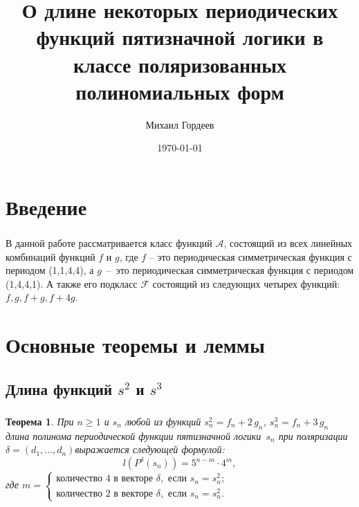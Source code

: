 \documentclass[t]{beamer}
\title{О длине некоторых периодических функций пятизначной логики в классе поляризованных
    полиномиальных форм}
\author{Михаил Гордеев}
\date{\today}
\institute[МГУ]{МОСКОВСКИЙ ГОСУДАРСТВЕННЫЙ УНИВЕРСИТЕТ \\
    Факультет Вычислительной Математики и Кибернетики}
\newtheorem{myth}{Теорема}
\newtheorem*{mydef}{Определение}
\begin{document}
\frame[plain]{\titlepage}

\section{Введение}
\begin{frame}
\frametitle{\insertsection}
В данной работе рассматривается класс функций $\mathcal{A}$, состоящий из всех линейных комбинаций
функций $f$ и $g$, где $f$ -- это периодическая симметрическая функция с периодом (1,1,4,4), а
\mbox{$g$ -- это} периодическая симметрическая функция с периодом (1,4,4,1). А также его подкласс
$\mathcal{F}$ состоящий из следующих четырех функций: $f,g,f+g,f+4g$.
\end{frame}

\section{Основные теоремы и леммы}
\subsection{Длина функций $s^2$ и $s^3$}
\begin{frame}
\frametitle{\insertsection}
\framesubtitle{\insertsubsection}
\begin{myth}
\label{ths}
При $n \geqslant 1$ и $s_n$ любой из функций ${s^2_n = f_n + 2\,g_n}$, ${s^3_n = f_n + 3\,g_n}$
длина полинома периодической функции пятизначной логики~$s_n$
при поляризации $\delta = (d_1,\ldots,d_n)$выражается следующей формулой:
$$ l(P^{\delta}(s_n)) = 5^{n-m} \cdot 4^m ,$$
где $m = \begin{cases}
\text{количество } 4 \text{ в векторе } \delta, \text{ если } s_n = s^2_n; \\
\text{количество } 2 \text{ в векторе } \delta, \text{ если } s_n = s^2_n.
\end{cases}$
\end{myth}
\end{frame}
\end{document}
